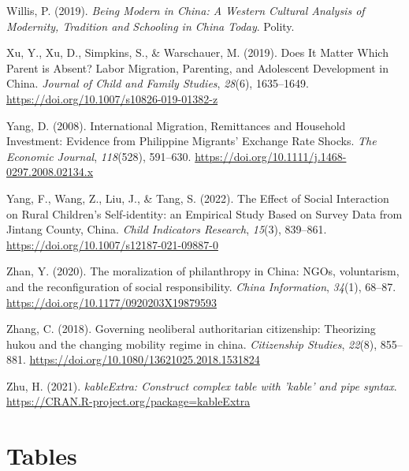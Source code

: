 \documentclass[
  man,floatsintext]{apa7}
\newlength{\cslhangindent}
\newlength{\cslentryspacingunit} %
\newenvironment{CSLReferences}[2] %
 {%
  \setlength{\parindent}{0pt}
  \ifodd #1
  \let\oldpar\par
  \def\par{\hangindent=\cslhangindent\oldpar}
  \fi
  \setlength{\parskip}{#2\cslentryspacingunit}
 }%
 {}
\begin{document}
\begin{CSLReferences}{1}{0}
\leavevmode{}%
Willis, P. (2019). \emph{Being Modern in China: A Western Cultural Analysis of Modernity, Tradition and Schooling in China Today}. Polity.

\leavevmode{}%
Xu, Y., Xu, D., Simpkins, S., \& Warschauer, M. (2019). Does It Matter Which Parent is Absent? Labor Migration, Parenting, and Adolescent Development in China. \emph{Journal of Child and Family Studies}, \emph{28}(6), 1635--1649. \url{https://doi.org/10.1007/s10826-019-01382-z}

\leavevmode{}%
Yang, D. (2008). International Migration, Remittances and Household Investment: Evidence from Philippine Migrants{'} Exchange Rate Shocks. \emph{The Economic Journal}, \emph{118}(528), 591--630. \url{https://doi.org/10.1111/j.1468-0297.2008.02134.x}

\leavevmode{}%
Yang, F., Wang, Z., Liu, J., \& Tang, S. (2022). The Effect of Social Interaction on Rural Children{'}s Self-identity: an Empirical Study Based on Survey Data from Jintang County, China. \emph{Child Indicators Research}, \emph{15}(3), 839--861. \url{https://doi.org/10.1007/s12187-021-09887-0}

\leavevmode{}%
Zhan, Y. (2020). The moralization of philanthropy in China: NGOs, voluntarism, and the reconfiguration of social responsibility. \emph{China Information}, \emph{34}(1), 68--87. \url{https://doi.org/10.1177/0920203X19879593}

\leavevmode{}%
Zhang, C. (2018). Governing neoliberal authoritarian citizenship: Theorizing hukou and the changing mobility regime in china. \emph{Citizenship Studies}, \emph{22}(8), 855--881. \url{https://doi.org/10.1080/13621025.2018.1531824}

\leavevmode{}%
Zhu, H. (2021). \emph{kableExtra: Construct complex table with 'kable' and pipe syntax}. \url{https://CRAN.R-project.org/package=kableExtra}

\end{CSLReferences}

\newpage

\hypertarget{appendix-appendix}{%
\appendix}


\hypertarget{tables}{%
\section{Tables}\label{tables}}
\end{document}
